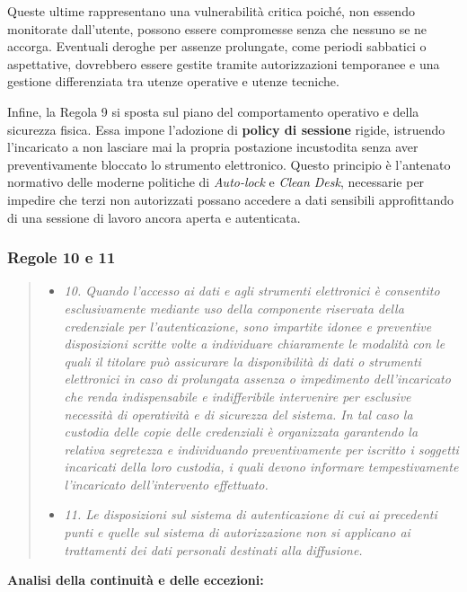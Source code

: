 Queste ultime rappresentano una vulnerabilità critica poiché, non essendo monitorate dall'utente, possono essere compromesse senza che nessuno se ne accorga. Eventuali deroghe per assenze prolungate, come periodi sabbatici o aspettative, dovrebbero essere gestite tramite autorizzazioni temporanee e una gestione differenziata tra utenze operative e utenze tecniche.

Infine, la Regola 9 si sposta sul piano del comportamento operativo e della sicurezza fisica. Essa impone l'adozione di \textbf{policy di sessione} rigide, istruendo l'incaricato a non lasciare mai la propria postazione incustodita senza aver preventivamente bloccato lo strumento elettronico. Questo principio è l'antenato normativo delle moderne politiche di \textit{Auto-lock} e \textit{Clean Desk}, necessarie per impedire che terzi non autorizzati possano accedere a dati sensibili approfittando di una sessione di lavoro ancora aperta e autenticata.

\subsubsection*{Regole 10 e 11}
\begin{quote}
    \begin{itemize}
        \item \textit{10. Quando l'accesso ai dati e agli strumenti elettronici è consentito esclusivamente mediante uso della componente riservata della credenziale per l'autenticazione, sono impartite idonee e preventive disposizioni scritte volte a individuare chiaramente le modalità con le quali il titolare può assicurare la disponibilità di dati o strumenti elettronici in caso di prolungata assenza o impedimento dell'incaricato che renda indispensabile e indifferibile intervenire per esclusive necessità di operatività e di sicurezza del sistema. In tal caso la custodia delle copie delle credenziali è organizzata garantendo la relativa segretezza e individuando preventivamente per iscritto i soggetti incaricati della loro custodia, i quali devono informare tempestivamente l'incaricato dell'intervento effettuato.}
        \item \textit{11. Le disposizioni sul sistema di autenticazione di cui ai precedenti punti e quelle sul sistema di autorizzazione non si applicano ai trattamenti dei dati personali destinati alla diffusione.}
    \end{itemize}
\end{quote}

\textbf{Analisi della continuità e delle eccezioni:}

